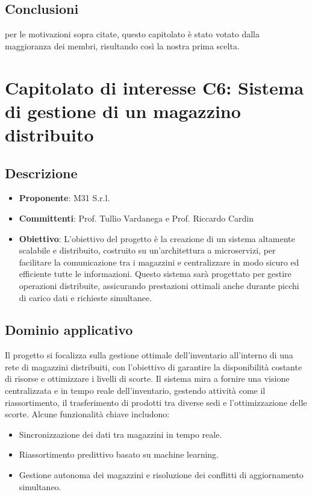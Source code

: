 \documentclass[italian, 12pt]{article}
\begin{document}
\subsection{Conclusioni}
per le motivazioni sopra citate, questo capitolato è stato votato dalla maggioranza dei membri, risultando così la nostra prima scelta.

\section{Capitolato di interesse C6: Sistema di gestione di un magazzino distribuito}
\subsection{Descrizione}
\begin{itemize}
\item\textbf{Proponente}: M31 S.r.l.
\item\textbf{Committenti}: Prof. Tullio Vardanega e Prof. Riccardo Cardin
\item\textbf{Obiettivo}: L’obiettivo del progetto è la creazione di un sistema altamente scalabile e distribuito, costruito su un’architettura a microservizi, per facilitare la comunicazione tra i magazzini e centralizzare in modo sicuro ed efficiente tutte le informazioni. Questo sistema sarà progettato per gestire operazioni distribuite, assicurando prestazioni ottimali anche durante picchi di carico dati e richieste simultanee.
\end{itemize}

\subsection{Dominio applicativo}
Il progetto si focalizza sulla gestione ottimale dell'inventario all'interno di una rete di magazzini distribuiti, con l'obiettivo di garantire la disponibilità costante di risorse e ottimizzare i livelli di scorte. Il sistema mira a fornire una visione centralizzata e in tempo reale dell'inventario, gestendo attività come il riassortimento, il trasferimento di prodotti tra diverse sedi e l'ottimizzazione delle scorte. Alcune funzionalità chiave includono: 
\begin{itemize}
\item Sincronizzazione dei dati tra magazzini in tempo reale. 
\item Riassortimento predittivo basato su machine learning. \item Gestione autonoma dei magazzini e risoluzione dei conflitti di aggiornamento simultaneo.
\end{itemize}
\end{document}
